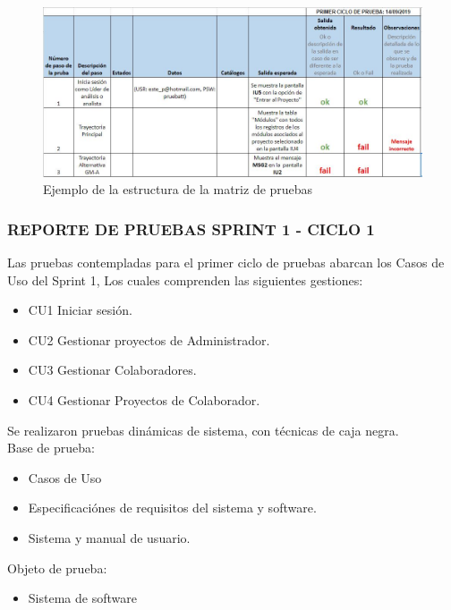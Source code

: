 \begin{figure}[H]
	\begin{center}
		\includegraphics[width=.95\textwidth]{images/pruebas/diseno/tabla}
		\caption{Ejemplo de la estructura de la matriz de pruebas}
		\label{fig:estructura}
	\end{center}
\end{figure}

\subsubsection{REPORTE DE PRUEBAS SPRINT 1 - CICLO 1}

Las pruebas contempladas para el primer ciclo de pruebas abarcan los Casos de Uso del Sprint 1, Los cuales comprenden las siguientes gestiones:

\begin{itemize}
	\item CU1 Iniciar sesión.
	\item CU2 Gestionar proyectos de Administrador.
	\item CU3 Gestionar Colaboradores.
	\item CU4 Gestionar Proyectos de Colaborador.
\end{itemize}

Se realizaron pruebas dinámicas de sistema, con técnicas de caja negra.\\

Base de prueba:
\begin{itemize}
	\item Casos de Uso
	\item Especificaciónes de requisitos del sistema y software.
	\item Sistema y manual de usuario.
\end{itemize}

Objeto de prueba:
\begin{itemize}
	\item Sistema de software
\end{itemize}

